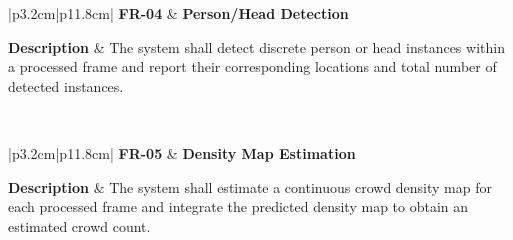 
\begin{table}[H]
	\centering
	\renewcommand{\arraystretch}{1.25}
	\begin{tabular}{|p{3.2cm}|p{11.8cm}|}
		\hline
		\textbf{FR-04} &
		\textbf{Person/Head Detection} \\ \hline
		
		\textbf{Description} &
		The system shall detect discrete person or head instances within a processed frame and report their corresponding locations and total number of detected instances. \\ \hline
		
		 \\ \hline
	\end{tabular}
	\caption{Functional requirement for person or head detection.}
	\label{tab:fr04}
\end{table}



\begin{table}[H]
	\centering
	\renewcommand{\arraystretch}{1.25}
	\begin{tabular}{|p{3.2cm}|p{11.8cm}|}
		\hline
		\textbf{FR-05} &
		\textbf{Density Map Estimation} \\ \hline
		
		\textbf{Description} &
		The system shall estimate a continuous crowd density map for each processed frame and integrate the predicted density map to obtain an estimated crowd count. \\ \hline
		
		 \\ \hline
	\end{tabular}
	\caption{Functional requirement for density map estimation.}
	\label{tab:fr05}
\end{table}


